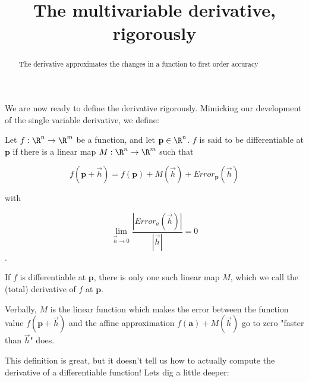 \documentclass{ximera}
\title{The multivariable derivative, rigorously}
\begin{document}
	\begin{abstract}
		The derivative approximates the changes in a function to first order accuracy
	\end{abstract}
	
	We are now ready to define the derivative rigorously.  Mimicking our development of the single variable derivative, we define:

\begin{definition}
	Let $f :\R^n \to \R^m$ be a function, and let $\mathbf{p} \in \R^n$.  
	 $f$ is said to be differentiable at $\mathbf{p}$ if there is a linear map $M:\R^n \to \R^m$ such that 
		
		\[ f(\mathbf{p}+\vec{h}) = f(\mathbf{p}) + M(\vec{h})+ Error_{\mathbf{p}}(\vec{h})\]
		
		with
		
		\[ \lim_{\vec{h} \to 0} \frac{\left|Error_a(\vec{h})\right|}{\left|\vec{h}\right|} = 0 \].
		
		If $f$ is differentiable at $\mathbf{p}$, there is only one such linear map $M$, which we call the (total) derivative of $f$ at $\mathbf{p}$.  
		
		Verbally,  $M$ is the linear function which makes the error between the function value $f(\mathbf{p}+\vec{h})$ and the affine approximation 
		$f(\mathbf{a})+M(\vec{h})$ go to zero "faster than $\vec{h}$" does.
\end{definition}

This definition is great, but it doesn't tell us how to actually compute the derivative of a differentiable function!  Lets dig a little deeper:
\end{document}
